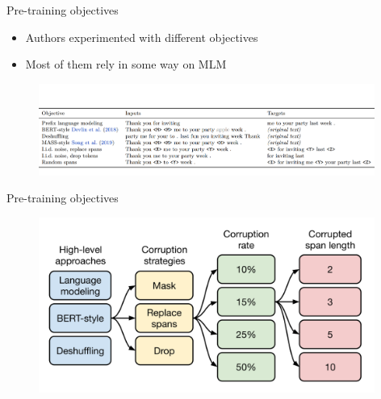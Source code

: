 
\begin{frame}{Pre-training objectives}

\vfill

	\begin{itemize}
		\item Authors experimented with different objectives
		\item Most of them rely in some way on MLM
	\end{itemize}
	
	\begin{figure}
		\centering
		\includegraphics[width = 11cm]{figure/63-t5-objectives1.png}\\ 
	\end{figure}
	
\vfill

\end{frame}


\begin{frame}{Pre-training objectives}

\vfill

	\begin{figure}
		\centering
		\includegraphics[width = 11cm]{figure/63-t5-objectives2.png}\\ 
	\end{figure}
	
\vfill

\end{frame}

